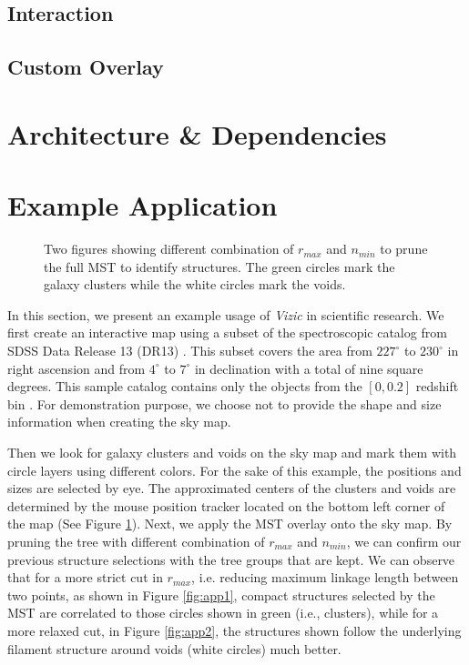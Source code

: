 \documentclass[5p,authoryear]{elsarticle}
\begin{document}
\subsection{Interaction}
\label{interaction}


\subsection{Custom Overlay}
\label{adv}


\section{Architecture \& Dependencies}
\label{technical}


\section{Example Application}
\label{application}
\begin{figure}[h]
    \centering
    \hfill
    \caption{Two figures showing different combination of $r_{max}$ and $n_{min}$ to prune the full MST to identify structures. The green circles mark the galaxy clusters while the white circles mark the voids.}
    \label{fig:app}
\end{figure}
In this section, we present an example usage of \textit{Vizic} in scientific research. We first create an interactive map using a subset of the spectroscopic catalog from SDSS Data Release 13 (DR13) \citep{dr13, sdss_cam}.
This subset covers the area from $227^\circ$ to $230^\circ$ in right ascension and from $4^\circ$ to $7^\circ$ in declination with a total of nine square degrees.
This sample catalog contains only the objects from the $[0, 0.2]$ redshift bin \citep{sdss_spec}. For demonstration purpose, we choose not to provide the shape and size information when creating the sky map.

Then we look for galaxy clusters and voids on the sky map and mark them with circle layers using different colors. For the sake of this example, the positions and sizes are selected by eye.
The approximated centers of the clusters and voids are determined by the mouse position tracker located on the bottom left corner of the map (See Figure \ref{fig:app}). Next, we apply the MST overlay onto the sky map.
By pruning the tree with different combination of $r_{max}$ and $n_{min}$, we can confirm our previous structure selections with the tree groups that are kept.
We can observe that for a more strict cut in $r_{max}$, i.e. reducing maximum linkage length between two points, as shown in Figure \ref{fig:app1}, compact structures selected by the MST are correlated to those circles shown in green (i.e., clusters), while for a more relaxed cut, in Figure \ref{fig:app2}, the structures shown follow the underlying filament structure around voids (white circles) much better.
\end{document}
